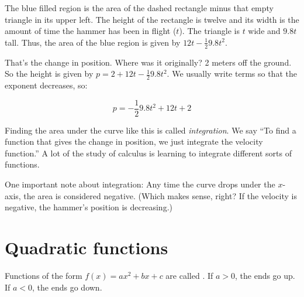 The blue filled region is the area of the dashed rectangle minus that
empty triangle in its upper left.  The height of the rectangle is
twelve and its width is the amount of time the hammer has been in
flight ($t$). The triangle is $t$ wide and $9.8t$ tall. Thus, the
area of the blue region is given by $12t - \frac{1}{2}9.8 t^2$.

That's the change in position. Where was it originally? 2 meters off
the ground. So the height is given by $p = 2 + 12t - \frac{1}{2}9.8t^2$.
We usually write terms so that the exponent decreases, so:

$$p = - \frac{1}{2}9.8t^2 + 12t + 2$$

Finding the area under the curve like this is called
\textit{integration}. We say ``To find a function that gives the
change in position, we just integrate the velocity function.''  A lot
of the study of calculus is learning to integrate different sorts of
functions.

One important note about integration: Any time the curve drops under
the $x$-axis, the area is considered negative. (Which makes sense,
right? If the velocity is negative, the hammer's position is
decreasing.)




\section{Quadratic functions}

Functions of the form $f(x) = a x^2 + b x + c$ are called . 
If $a > 0$, the ends go up.
If $a < 0$, the ends go down.


